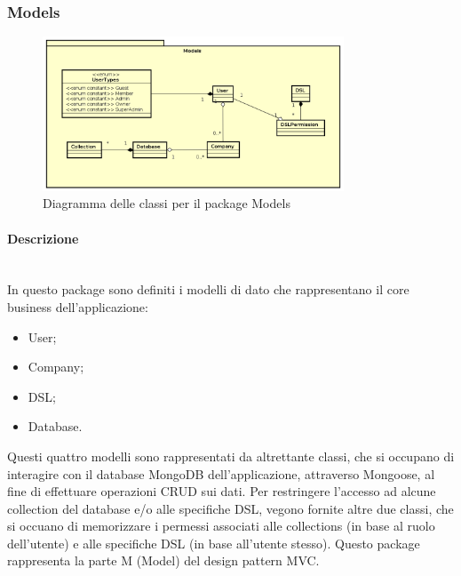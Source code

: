 \subsubsection{Models}
\begin{figure}[h]
\centering
\includegraphics[width=0.8\textwidth]{res/sections/backend/Models.png}
\caption{Diagramma delle classi per il package Models}
\end{figure}
\paragraph{Descrizione} \mbox{}\\
In questo package sono definiti i modelli di dato che rappresentano il core business dell'applicazione:
\begin{itemize}
\item User;
\item Company;
\item DSL;
\item Database.
\end{itemize}
Questi quattro modelli sono rappresentati da altrettante classi, che si occupano di interagire con il database MongoDB dell'applicazione, attraverso Mongoose, al fine di effettuare operazioni CRUD sui dati. Per restringere l'accesso ad alcune collection del database e/o alle specifiche DSL, vegono fornite altre due classi, che si occuano di memorizzare i permessi associati alle collections (in base al ruolo dell'utente) e alle specifiche DSL (in base all'utente stesso). Questo package rappresenta la parte M (Model) del design pattern MVC.
